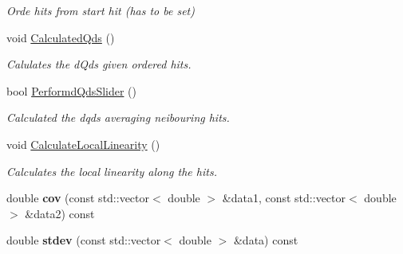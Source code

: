 \begin{DoxyCompactItemize}
\begin{DoxyCompactList}\small\item\em Orde hits from start hit (has to be set) \end{DoxyCompactList}\item 
\hypertarget{classubana_1_1StoppingMuonTaggerHelper_a7e758722bf205acfc3c2d4b73fa1ddd1}{void \hyperlink{classubana_1_1StoppingMuonTaggerHelper_a7e758722bf205acfc3c2d4b73fa1ddd1}{Calculated\-Qds} ()}\label{classubana_1_1StoppingMuonTaggerHelper_a7e758722bf205acfc3c2d4b73fa1ddd1}

\begin{DoxyCompactList}\small\item\em Calulates the d\-Qds given ordered hits. \end{DoxyCompactList}\item 
\hypertarget{classubana_1_1StoppingMuonTaggerHelper_a7a41fc749aeb7c8733c06fe84bad6971}{bool \hyperlink{classubana_1_1StoppingMuonTaggerHelper_a7a41fc749aeb7c8733c06fe84bad6971}{Performd\-Qds\-Slider} ()}\label{classubana_1_1StoppingMuonTaggerHelper_a7a41fc749aeb7c8733c06fe84bad6971}

\begin{DoxyCompactList}\small\item\em Calculated the dqds averaging neibouring hits. \end{DoxyCompactList}\item 
\hypertarget{classubana_1_1StoppingMuonTaggerHelper_a6ee2f2a92f71be01b7b939c5db4aa835}{void \hyperlink{classubana_1_1StoppingMuonTaggerHelper_a6ee2f2a92f71be01b7b939c5db4aa835}{Calculate\-Local\-Linearity} ()}\label{classubana_1_1StoppingMuonTaggerHelper_a6ee2f2a92f71be01b7b939c5db4aa835}

\begin{DoxyCompactList}\small\item\em Calculates the local linearity along the hits. \end{DoxyCompactList}\item 
\hypertarget{classubana_1_1StoppingMuonTaggerHelper_ada3f6e68f05be278e5b91130b95855d7}{double {\bfseries cov} (const std\-::vector$<$ double $>$ \&data1, const std\-::vector$<$ double $>$ \&data2) const }\label{classubana_1_1StoppingMuonTaggerHelper_ada3f6e68f05be278e5b91130b95855d7}

\item 
\hypertarget{classubana_1_1StoppingMuonTaggerHelper_ab8c40057399c320d99e58ed001d3f0ba}{double {\bfseries stdev} (const std\-::vector$<$ double $>$ \&data) const }\label{classubana_1_1StoppingMuonTaggerHelper_ab8c40057399c320d99e58ed001d3f0ba}


\end{DoxyCompactItemize}
